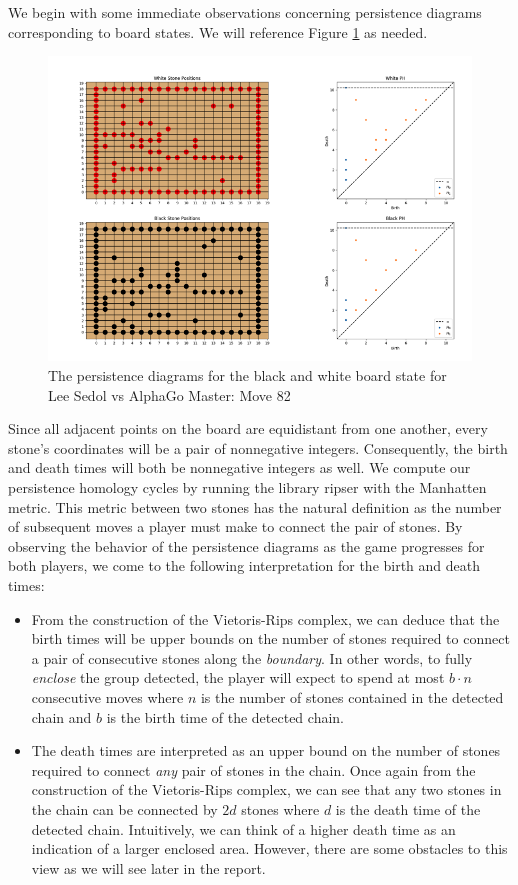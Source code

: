 \documentclass[11pt]{article}
\begin{document}
We begin with some immediate observations concerning persistence diagrams corresponding to board states. We will reference Figure \ref{fig:lsd1} as needed.
\begin{figure}[ht]
  \centering
  \includegraphics{lsd1.png}
  \caption{The persistence diagrams for the black and white board state for Lee Sedol vs AlphaGo Master: Move 82}
  \label{fig:lsd1}
\end{figure}

Since all adjacent points on the board are equidistant from one another, every stone's coordinates will be a pair of nonnegative integers. Consequently, the birth and death times will both be nonnegative integers as well. We compute our persistence homology cycles by running the library ripser with the Manhatten metric. This metric between two stones has the natural definition as the number of subsequent moves a player must make to connect the pair of stones. By observing the behavior of the persistence diagrams as the game progresses for both players, we come to the following interpretation for the birth and death times:
\begin{itemize}
  \item From the construction of the Vietoris-Rips complex, we can deduce that the birth times will be upper bounds on the number of stones required to connect a pair of consecutive stones along the \textit{boundary}. In other words, to fully \textit{enclose} the group detected, the player will expect to spend at most $b\cdot n$ consecutive moves where $n$ is the number of stones contained in the detected chain and $b$ is the birth time of the detected chain.
  \item The death times are interpreted as an upper bound on the number of stones required to connect \textit{any} pair of stones in the chain. Once again from the construction of the Vietoris-Rips complex, we can see that any two stones in the chain can be connected by $2d$ stones where $d$ is the death time of the detected chain. Intuitively, we can think of a higher death time as an indication of a larger enclosed area. However, there are some obstacles to this view as we will see later in the report.
\end{itemize}
\end{document}
